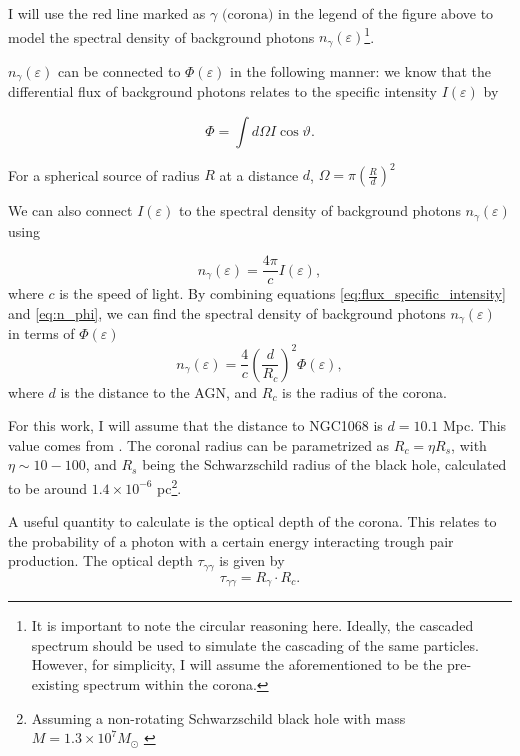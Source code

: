 I will use the red line marked as $\gamma \text{ (corona)}$ in the legend of the figure above to model the spectral density of background photons $n_{\gamma}(\varepsilon)$\footnote{It is important to note the circular reasoning here. Ideally, the cascaded spectrum should be used to simulate the cascading of the same particles. However, for simplicity, I will assume the aforementioned to be the pre-existing spectrum within the corona.}.

$n_{\gamma}(\varepsilon)$ can be connected to $\Phi(\varepsilon)$ in the following manner: we know that the differential flux of background photons relates to the specific intensity $I(\varepsilon)$ by

\begin{equation}
    \Phi = \int d\Omega I \cos \vartheta.
    \label{eq:flux_specific_intensity}
\end{equation}

For a spherical source of radius $R$ at a distance $d$, $\Omega = \pi \left(\frac{R}{d}\right)^2$

We can also connect $I(\varepsilon)$ to the spectral density of background photons $n_{\gamma}(\varepsilon)$ using

\begin{equation}
    n_{\gamma}(\varepsilon) = \frac{4\pi}{c}I(\varepsilon),
    \label{eq:n_phi}
\end{equation} where $c$ is the speed of light. By combining equations \eqref{eq:flux_specific_intensity} and \eqref{eq:n_phi}, we can find the spectral density of background photons $n_{\gamma}(\varepsilon)$ in terms of $\Phi(\varepsilon)$
\begin{equation}
    n_{\gamma}(\varepsilon) = \frac{4}{c}\left(\frac{d}{R_c}\right)^2\Phi(\varepsilon),
    \label{eq:n_gamma}
\end{equation}
where $d$ is the distance to the AGN, and $R_c$ is the radius of the corona.

For this work, I will assume that the distance to NGC1068 is $d = 10.1$ Mpc. This value comes from \citet{padovani2024highenergyneutrinosvicinitysupermassive}. The coronal radius can be parametrized as $R_c = \eta R_s$, with $\eta \sim 10 - 100$, and $R_s$ being the Schwarzschild radius of the black hole, calculated to be around $1.4 \times 10^{-6}$ pc\footnote{Assuming a non-rotating Schwarzschild black hole with mass $M = 1.3 \times 10^7 M_{\odot}$ \citep{Blackhole}}.

A useful quantity to calculate is the optical depth of the corona. This relates to the probability of a photon with a certain energy interacting trough pair production. The optical depth $\tau_{\gamma\gamma}$ is given by 
\begin{equation*}
    \tau_{\gamma\gamma} = R_{\gamma} \cdot  R_c.
\end{equation*}


